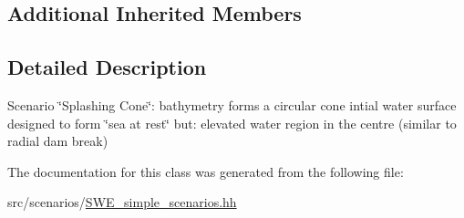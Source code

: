 \subsection*{Additional Inherited Members}


\subsection{Detailed Description}
Scenario \char`\"{}\-Splashing Cone\char`\"{}\-: bathymetry forms a circular cone intial water surface designed to form \char`\"{}sea at rest\char`\"{} but\-: elevated water region in the centre (similar to radial dam break) 

The documentation for this class was generated from the following file\-:\begin{DoxyCompactItemize}
\item 
src/scenarios/\hyperlink{SWE__simple__scenarios_8hh}{S\-W\-E\-\_\-simple\-\_\-scenarios.\-hh}\end{DoxyCompactItemize}

